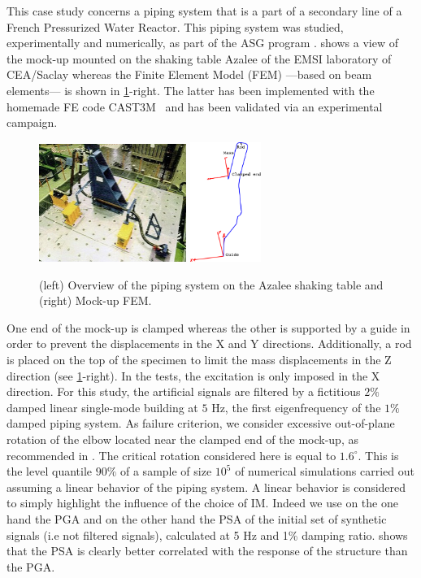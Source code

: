 This case study concerns a piping system that is a part of a secondary line of a French Pressurized Water Reactor. This piping system was studied, experimentally and numerically, as part of the ASG program \citep{touboul_seismic_1999}.   shows a view of the mock-up mounted on the shaking table Azalee of the EMSI laboratory of CEA/Saclay whereas the Finite Element Model (FEM) ---based on beam elements--- is shown in \cref{uncIM:fig:ASG}-right. The latter has been implemented with the homemade FE code CAST3M~\citep{cea_cast3m_2019} and has been validated via  an experimental campaign.%

	\begin{figure}[!ht]
		\centering		
		\includegraphics[width=4.8cm]{figures/intro-frags/ASG.jpg}
		\hspace{1cm}
		\includegraphics[width=2.3cm]{figures/intro-frags/ASG_FEM.pdf}
		\caption{(left) Overview of the piping system on the Azalee shaking table and (right) Mock-up FEM.}
		 \label{uncIM:fig:ASG}
	\end{figure}

One end of the mock-up is clamped whereas the other is supported by a guide in order to prevent the displacements in the X and Y directions. Additionally, a rod is  placed on the top of the specimen to limit the mass displacements in the Z direction (see \cref{uncIM:fig:ASG}-right). In the tests, the excitation is only imposed in the X direction. For this study, the artificial signals are filtered by a fictitious $2\%$ damped linear single-mode building at $5$ Hz, the first eigenfrequency of the $1\%$ damped piping system. As failure criterion, we consider excessive out-of-plane rotation of the elbow located near the clamped end of the mock-up, as recommended in \cite{touboul_enhanced_2006}. The critical rotation considered here is equal to $1.6^{\circ}$. This is the level quantile $90\%$ of a sample of size $10^5$ of numerical simulations carried out assuming a linear behavior of the piping system. A linear behavior is considered to simply highlight the influence of the choice of IM. Indeed we use on the one hand the PGA and on the other hand the PSA of the initial set of synthetic signals (i.e not filtered signals), calculated at 5 Hz and 1\% damping ratio.  shows that the PSA is clearly better correlated with the response of the structure than the PGA. 

